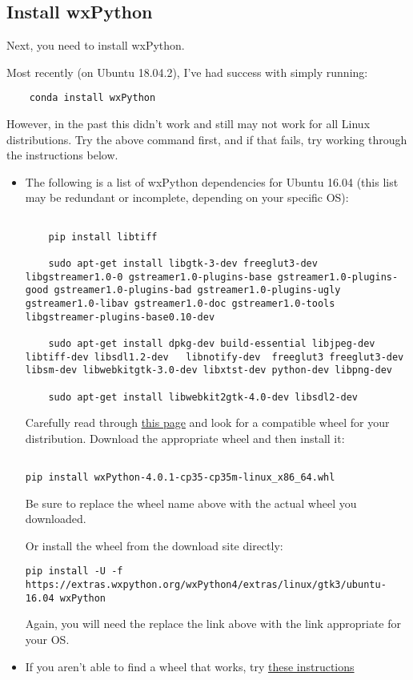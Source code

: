 \documentclass[11pt]{article}
\begin{document}
\subsection{Install wxPython}

Next, you need to install wxPython.

Most recently (on Ubuntu 18.04.2), I've had success with simply running:

\begin{verbatim}
    conda install wxPython
\end{verbatim}

However, in the past this didn't work and still may not work for all Linux distributions.  Try the above command first, and if that fails, try working through the instructions below.


\begin{itemize}
  \item The following is a list of wxPython dependencies for Ubuntu 16.04 (this list may be redundant or incomplete, depending on your specific OS):

  \begin{verbatim}

    pip install libtiff

    sudo apt-get install libgtk-3-dev freeglut3-dev libgstreamer1.0-0 gstreamer1.0-plugins-base gstreamer1.0-plugins-good gstreamer1.0-plugins-bad gstreamer1.0-plugins-ugly gstreamer1.0-libav gstreamer1.0-doc gstreamer1.0-tools libgstreamer-plugins-base0.10-dev

    sudo apt-get install dpkg-dev build-essential libjpeg-dev  libtiff-dev libsdl1.2-dev   libnotify-dev  freeglut3 freeglut3-dev libsm-dev libwebkitgtk-3.0-dev libxtst-dev python-dev libpng-dev

    sudo apt-get install libwebkit2gtk-4.0-dev libsdl2-dev
\end{verbatim}


Carefully read through \href{https://wxpython.org/pages/downloads/}{this page} and look for a compatible wheel for your distribution.  Download the appropriate wheel and then install it:
\begin{verbatim}

pip install wxPython-4.0.1-cp35-cp35m-linux_x86_64.whl

\end{verbatim}

Be sure to replace the wheel name above with the actual wheel you downloaded.

Or install the wheel from the download site directly:
\begin{verbatim}
pip install -U -f https://extras.wxpython.org/wxPython4/extras/linux/gtk3/ubuntu-16.04 wxPython

\end{verbatim}

Again, you will need the replace the link above with the link appropriate for your OS.

\item If you aren't able to find a wheel that works, try \href{https://wxpython.org/blog/2017-08-17-builds-for-linux-with-pip/}{these instructions}

\end{itemize}
\end{document}

